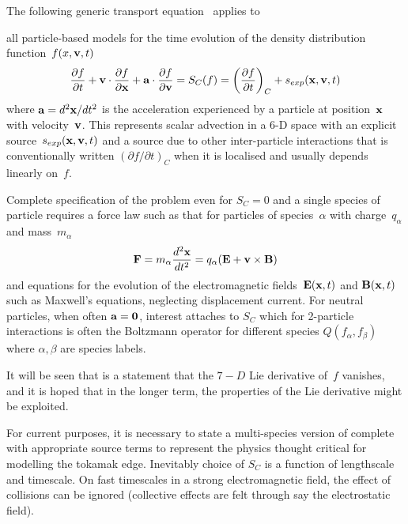 The following generic transport equation~\cite[\S\,1]{duderstadtmartin} applies to


all particle-based models for the time
evolution of the density distribution function~$f (x,{\bf v},t)$
\begin{equation} \label{eq:transport}
\frac{\partial f}{\partial t}
+ {\bf v} \cdot \frac{\partial f}{\partial {\bf x}}
+ {\bf a} \cdot \frac{\partial f}{\partial {\bf v}} 
= S_C(f)
=\left(\frac{\partial f}{\partial t}\right)_C + s_{exp}({\bf x},{\bf v},t)
\end{equation}
where ${\bf a} = d^2 {\bf x}/dt^2$ is the acceleration experienced by a particle
at position~${\bf x}$ with velocity~${\bf v}$. This represents scalar
advection in a 6-D space with an explicit source~$s_{exp}({\bf x}, {\bf v},t)$
and a source due to other inter-particle interactions that is conventionally written
$(\partial f/\partial t)_C$ when it is localised and usually depends linearly on~$f$.

Complete specification of the problem even for $S_C=0$ and a single species of particle
requires a force law such as that for particles of species~$\alpha$
with charge~$q_\alpha$ and mass~$m_\alpha$
\begin{equation}\label{eq:forcelaw}
{\bf F} = m_\alpha \frac{d^2 {\bf x}}{dt^2} = q_\alpha ({\bf E} + {\bf v} \times {\bf B})
\end{equation}
and equations for the evolution of the electromagnetic fields~${\bf E}({\bf x},t)$ 
and ${\bf B}({\bf x},t)$ such as Maxwell's equations, neglecting displacement current.
For neutral particles, when often ${\bf a}={\bf 0}$, interest attaches to $S_C$
which for 2-particle interactions is often the Boltzmann operator for 
different species $Q(f_\alpha, f_\beta)$ where $\alpha,\beta$ are species labels.

It will be seen that  is a statement that the $7-D$ Lie derivative of~$f$
vanishes, and it is hoped that in the longer term, the properties of the Lie derivative 
might be exploited.

For current purposes, it is necessary to state a multi-species version of 
complete with appropriate source terms to represent the physics thought critical for modelling the
tokamak edge. Inevitably choice of $S_C$ is a function of lengthscale and timescale.
On fast timescales in a strong electromagnetic field, the effect of collisions can
be ignored (collective effects are felt through say the electrostatic field).


